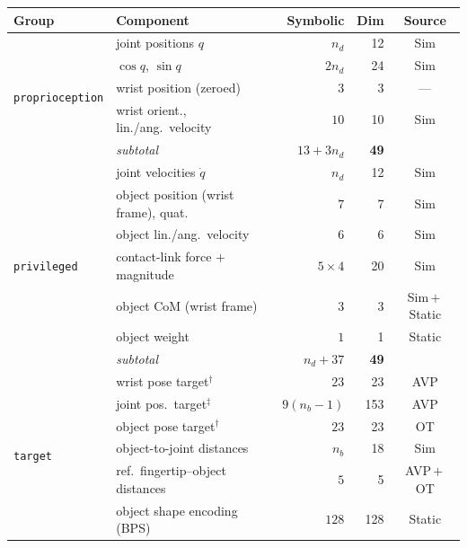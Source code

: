 \begin{table}[H]
  \centering
  \small
  \setlength{\tabcolsep}{4pt}
  \begin{tabular}{@{}llrrc@{}}
    \toprule
    Group & Component & Symbolic & Dim & Source \\
    \midrule
    \multirow{5}{*}{\texttt{proprioception}}
      & joint positions $q$                    & $n_d$          &  12 & Sim \\
      & $\cos q$, $\sin q$                     & $2n_d$         &  24 & Sim \\
      & wrist position (zeroed)                & $3$            &   3 & --- \\
      & wrist orient., lin./ang.\ velocity     & $10$           &  10 & Sim \\
    \cmidrule(l){2-5}
      & \emph{subtotal}                        & $13 + 3n_d$    & \textbf{49} & \\
    \midrule
    \multirow{7}{*}{\texttt{privileged}}
      & joint velocities $\dot{q}$             & $n_d$          &  12 & Sim \\
      & object position (wrist frame), quat.   & $7$            &   7 & Sim \\
      & object lin./ang.\ velocity             & $6$            &   6 & Sim \\
      & contact-link force $+$ magnitude       & $5\times4$     &  20 & Sim \\
      & object CoM (wrist frame)               & $3$            &   3 & Sim\,$+$\,Static \\
      & object weight                          & $1$            &   1 & Static \\
    \cmidrule(l){2-5}
      & \emph{subtotal}                        & $n_d + 37$     & \textbf{49} & \\
    \midrule
    \multirow{7}{*}{\texttt{target}}
      & wrist pose target$^{\dagger}$          & $23$           &  23 & AVP \\
      & joint pos.\ target$^{\ddagger}$        & $9(n_b\!-\!1)$ & 153 & AVP \\
      & object pose target$^{\dagger}$         & $23$           &  23 & OT \\
      & object-to-joint distances              & $n_b$          &  18 & Sim \\
      & ref.\ fingertip--object distances      & $5$            &   5 & AVP\,$+$\,OT \\
      & object shape encoding (BPS)            & $128$          & 128 & Static \\

\end{tabular}
\end{table}
